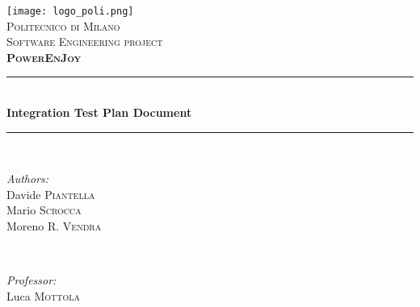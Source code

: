 \begin{titlepage}
\newcommand{\HRule}{\rule{\linewidth}{0.5mm}} %

\center %
 
\texttt{[image: logo\_poli.png]}\\[0.5cm] %
\textsc{\LARGE Politecnico di Milano}\\[2cm] %
\textsc{\Large Software Engineering  project}\\[0.5cm] %
\textsc{\large \textbf{PowerEnJoy}}\\[1.5cm] %


\HRule \\[0.4cm]
{ \huge \bfseries Integration Test Plan Document}\\[0.4cm] %
\HRule \\[1.5cm]
 

\begin{minipage}{0.4\textwidth}
\begin{flushleft} \large
\emph{Authors:}\\
Davide \textsc{Piantella}\\
Mario \textsc{Scrocca}\\
Moreno R. \textsc{Vendra} %
\end{flushleft}
\end{minipage}
~
\begin{minipage}{0.4\textwidth}
\begin{flushright} \large
\emph{Professor:} \\
Luca \textsc{Mottola} %
\end{flushright}
\end{minipage}\\[2cm]


\end{titlepage}
